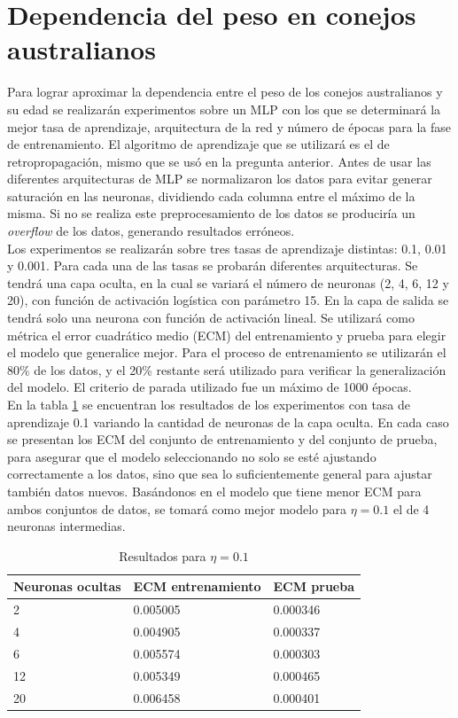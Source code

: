 \documentclass[a4paper]{article}
\begin{document}
\section{Dependencia del peso en conejos australianos}
Para lograr aproximar la dependencia entre el peso de los conejos australianos y su edad se realizarán experimentos sobre un MLP con los que se determinará la mejor tasa de aprendizaje, arquitectura de la red y número de épocas para la fase de entrenamiento. El algoritmo de aprendizaje que se utilizará es el de retropropagación, mismo que se usó en la pregunta anterior. Antes de usar las diferentes arquitecturas de MLP se normalizaron los datos para evitar generar saturación en las neuronas, dividiendo cada columna entre el máximo de la misma. Si no se realiza este preprocesamiento de los datos se produciría un \textit{overflow} de los datos, generando resultados erróneos.\\

Los experimentos se realizarán sobre tres tasas de aprendizaje distintas: 0.1, 0.01 y 0.001. Para cada una de las tasas se probarán diferentes arquitecturas. Se tendrá una capa oculta, en la cual se variará el número de neuronas (2, 4, 6, 12 y 20), con función de activación logística con parámetro 15. En la capa de salida se tendrá solo una neurona con función de activación lineal. Se utilizará como métrica el error cuadrático medio (ECM) del entrenamiento y prueba para elegir el modelo que generalice mejor. Para el proceso de entrenamiento se utilizarán el 80\% de los datos, y el 20\% restante será utilizado para verificar la generalización del modelo. El criterio de parada utilizado fue un máximo de 1000 épocas.\\


En la tabla \ref{tabla:conejos_1} se encuentran los resultados de los experimentos con tasa de aprendizaje 0.1 variando la cantidad de neuronas de la capa oculta. En cada caso se presentan los ECM del conjunto de entrenamiento y del conjunto de prueba, para asegurar que el modelo seleccionando no solo se esté ajustando correctamente a los datos, sino que sea lo suficientemente general para ajustar también datos nuevos. Basándonos en el modelo que tiene menor ECM para ambos conjuntos de datos, se tomará como mejor modelo para $\eta=0.1$ el de 4 neuronas intermedias.

		\begin{table}[H]
		\begin{center}
		\begin{tabular}{|l|l|l|}
		\hline
		Neuronas ocultas & ECM entrenamiento & ECM prueba\\
		\hline \hline
		2 & 0.005005 & 0.000346 \\ \hline
		4 & 0.004905 & 0.000337\\ \hline
		6 & 0.005574 & 0.000303\\ \hline
		12 & 0.005349 & 0.000465 \\ \hline
		20 & 0.006458 & 0.000401 \\ \hline
		\end{tabular}
		\caption{Resultados para $\eta=0.1$}
		\label{tabla:conejos_1}
		\end{center}
		\end{table}
		
\end{document}
